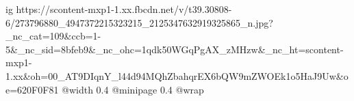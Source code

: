  
 
 
 
 

\ifcmt
  ig https://scontent-mxp1-1.xx.fbcdn.net/v/t39.30808-6/273796880_4947372215323215_2125347632919325865_n.jpg?_nc_cat=109&ccb=1-5&_nc_sid=8bfeb9&_nc_ohc=1qdk50WGqPgAX_zMHzw&_nc_ht=scontent-mxp1-1.xx&oh=00_AT9DIqnY_l44d94MQhZbahqrEX6bQW9mZWOEk1o5HaJ9Uw&oe=620F0F81
  @width 0.4
  @minipage 0.4
  @wrap \parpic[r]
\fi
